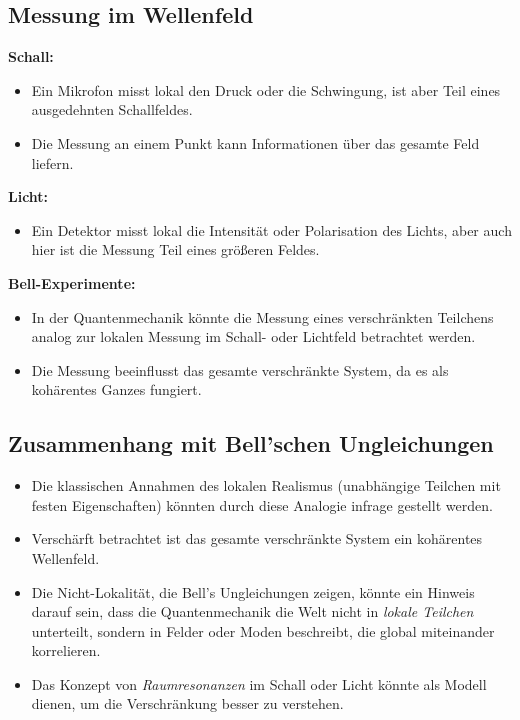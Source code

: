 \documentclass[12pt,a4paper]{article}
\begin{document}
	
	
	
	
	\subsection{Messung im Wellenfeld}
	\textbf{Schall:}
	\begin{itemize}
		\item Ein Mikrofon misst lokal den Druck oder die Schwingung, ist aber Teil eines ausgedehnten Schallfeldes.
		\item Die Messung an einem Punkt kann Informationen über das gesamte Feld liefern.
	\end{itemize}
	
	\textbf{Licht:}
	\begin{itemize}
		\item Ein Detektor misst lokal die Intensität oder Polarisation des Lichts, aber auch hier ist die Messung Teil eines größeren Feldes.
	\end{itemize}
	
	\textbf{Bell-Experimente:}
	\begin{itemize}
		\item In der Quantenmechanik könnte die Messung eines verschränkten Teilchens analog zur lokalen Messung im Schall- oder Lichtfeld betrachtet werden.
		\item Die Messung beeinflusst das gesamte verschränkte System, da es als kohärentes Ganzes fungiert.
	\end{itemize}
	
	\subsection{Zusammenhang mit Bell'schen Ungleichungen}
	\begin{itemize}
		\item Die klassischen Annahmen des lokalen Realismus (unabhängige Teilchen mit festen Eigenschaften) könnten durch diese Analogie infrage gestellt werden.
		\item Verschärft betrachtet ist das gesamte verschränkte System ein kohärentes Wellenfeld.
		\item Die Nicht-Lokalität, die Bell's Ungleichungen zeigen, könnte ein Hinweis darauf sein, dass die Quantenmechanik die Welt nicht in \textit{lokale Teilchen} unterteilt, sondern in Felder oder Moden beschreibt, die global miteinander korrelieren.
		\item Das Konzept von \textit{Raumresonanzen} im Schall oder Licht könnte als Modell dienen, um die Verschränkung besser zu verstehen.
	\end{itemize}
	
\end{document}
